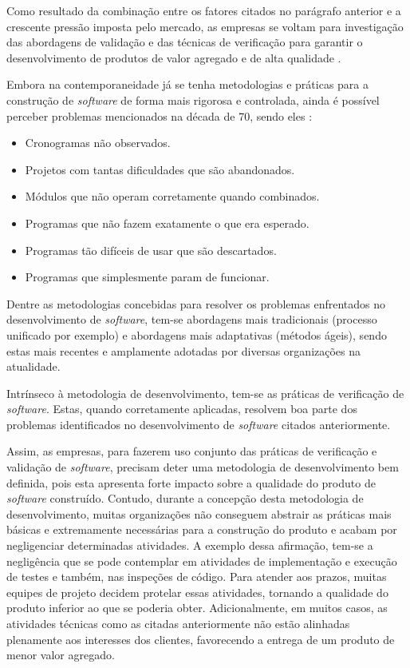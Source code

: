 Como resultado da combinação entre os fatores citados no parágrafo anterior e a crescente pressão imposta pelo mercado, as empresas se voltam para investigação das abordagens de validação e das técnicas de verificação para garantir o desenvolvimento de produtos de valor agregado e de alta qualidade \cite{vbse1}.

Embora na contemporaneidade já se tenha metodologias e práticas para a construção de \textit{software} de forma mais rigorosa e controlada, ainda é possível perceber problemas mencionados na década de 70, sendo eles \cite{qualidadesoftware}:

\begin{itemize}
	\item Cronogramas não observados.
	\item Projetos com tantas dificuldades que são abandonados.
	\item Módulos que não operam corretamente quando combinados.
	\item Programas que não fazem exatamente o que era esperado.
	\item Programas tão difíceis de usar que são descartados.
	\item Programas que simplesmente param de funcionar.
\end{itemize}

Dentre as metodologias concebidas para resolver os problemas enfrentados no desenvolvimento de \textit{software}, tem-se abordagens mais tradicionais (processo unificado por exemplo) e abordagens mais adaptativas (métodos ágeis), sendo estas mais recentes e amplamente adotadas por diversas organizações na atualidade.

Intrínseco à metodologia de desenvolvimento, tem-se as práticas de verificação de \textit{software}. Estas, quando corretamente aplicadas, resolvem boa parte dos problemas identificados no desenvolvimento de \textit{software} citados anteriormente.

Assim, as empresas, para fazerem uso conjunto das práticas de verificação e validação de \textit{software}, precisam deter uma metodologia de desenvolvimento bem definida, pois esta apresenta forte impacto sobre a qualidade do produto de \textit{software} construído. Contudo, durante a concepção desta metodologia de desenvolvimento, muitas organizações não conseguem abstrair as práticas mais básicas e extremamente necessárias para a construção do produto e acabam por negligenciar determinadas atividades. A exemplo dessa afirmação, tem-se a negligência que se pode contemplar em atividades de implementação e execução de testes e também, nas inspeções de código. Para atender aos prazos, muitas equipes de projeto decidem protelar essas atividades, tornando a qualidade do produto inferior ao que se poderia obter. Adicionalmente, em muitos casos, as atividades técnicas como as citadas anteriormente não estão alinhadas plenamente aos interesses dos clientes, favorecendo a entrega de um produto de menor valor agregado.

